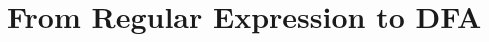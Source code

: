 %  
%  
%  
%  
%  
%  
%  
%  
%  
%  
%  
%  
%  
\section{From Regular Expression to DFA}\label{fsa2resec}

